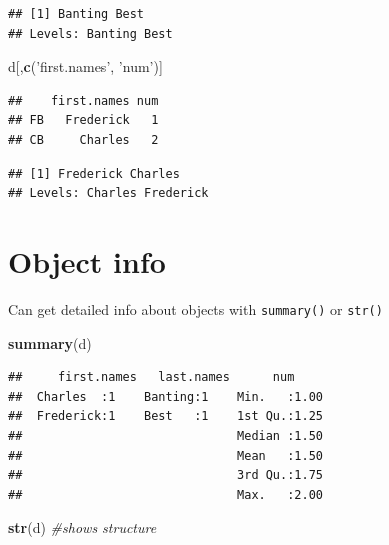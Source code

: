 \documentclass[]{article}
\newenvironment{Shaded}{\begin{snugshade}}{\end{snugshade}}
\newcommand{\KeywordTok}[1]{\textcolor[rgb]{0.13,0.29,0.53}{\textbf{#1}}}
\newcommand{\StringTok}[1]{\textcolor[rgb]{0.31,0.60,0.02}{#1}}
\newcommand{\CommentTok}[1]{\textcolor[rgb]{0.56,0.35,0.01}{\textit{#1}}}
\newcommand{\OperatorTok}[1]{\textcolor[rgb]{0.81,0.36,0.00}{\textbf{#1}}}
\newcommand{\NormalTok}[1]{#1}
\begin{document}
\begin{verbatim}
## [1] Banting Best   
## Levels: Banting Best
\end{verbatim}

\begin{Shaded}
\begin{Highlighting}[]
\NormalTok{d[,}\KeywordTok{c}\NormalTok{(}\StringTok{'first.names'}\NormalTok{, }\StringTok{'num'}\NormalTok{)]}
\end{Highlighting}
\end{Shaded}

\begin{verbatim}
##    first.names num
## FB   Frederick   1
## CB     Charles   2
\end{verbatim}

\begin{Shaded}
\end{Shaded}

\begin{verbatim}
## [1] Frederick Charles  
## Levels: Charles Frederick
\end{verbatim}

\section{Object info}\label{object-info}

Can get detailed info about objects with \texttt{summary()} or
\texttt{str()}

\begin{Shaded}
\begin{Highlighting}[]
\KeywordTok{summary}\NormalTok{(d)}
\end{Highlighting}
\end{Shaded}

\begin{verbatim}
##     first.names   last.names      num      
##  Charles  :1    Banting:1    Min.   :1.00  
##  Frederick:1    Best   :1    1st Qu.:1.25  
##                              Median :1.50  
##                              Mean   :1.50  
##                              3rd Qu.:1.75  
##                              Max.   :2.00
\end{verbatim}

\begin{Shaded}
\begin{Highlighting}[]
\KeywordTok{str}\NormalTok{(d) }\CommentTok{#shows structure}
\end{Highlighting}
\end{Shaded}
\end{document}
